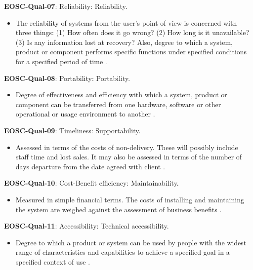 \textbf{EOSC-Qual-07}: Reliability: Reliability.

\begin{itemize}
    \item The reliability of systems from the user's point of view is concerned with three things: (1) How often does it go wrong? (2) How long is it unavailable? (3) Is any information lost at recovery? Also, degree to which a system, product or component performs specific functions under specified conditions for a specified period of time \cite{iso_25010_2011_2017,gillies_modelling_1992,boehm_quantitative_1976}.
\end{itemize}

\textbf{EOSC-Qual-08}: Portability: Portability.

\begin{itemize}
    \item Degree of effectiveness and efficiency with which a system, product or component can be transferred from one hardware, software or other operational or usage environment to another \cite{iso_25010_2011_2017,gillies_modelling_1992,boehm_quantitative_1976,shepherdson_cessda_2019,raymond_software_2013}.
\end{itemize}

\textbf{EOSC-Qual-09}: Timeliness: Supportability.

\begin{itemize}
    \item Assessed in terms of the costs of non-delivery. These will possibly include staff time and lost sales. It may also be assessed in terms of the number of days departure from the date agreed with client \cite{gillies_modelling_1992}.
\end{itemize}

\textbf{EOSC-Qual-10}: Cost-Benefit efficiency: Maintainability.

\begin{itemize}
    \item Measured in simple financial terms. The costs of installing and maintaining the system are weighed against the assessment of business benefits \cite{gillies_modelling_1992}.
\end{itemize}

\textbf{EOSC-Qual-11}: Accessibility: Technical accessibility.

\begin{itemize}
    \item Degree to which a product or system can be used by people with the widest range of characteristics and capabilities to achieve a specified goal in a specified context of use \cite{iso_25010_2011_2017,boehm_quantitative_1976}.
\end{itemize}

